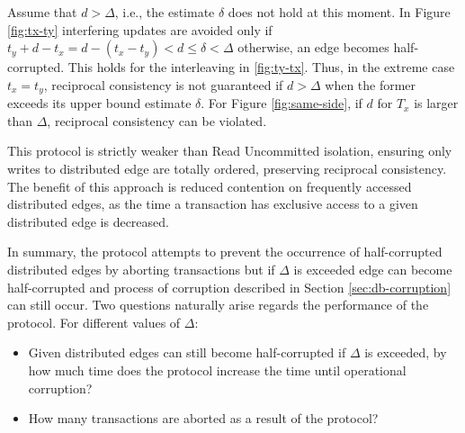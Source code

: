 Assume that $d > \Delta$, i.e., the estimate $\delta$ does not hold at this moment. In Figure \ref{fig:tx-ty} interfering updates are avoided only if $t_y + d - t_x = d - (t_x-t_y) < d \leq \delta < \Delta$ otherwise, an edge becomes half-corrupted. This holds for the interleaving in \ref{fig:ty-tx}. Thus, in the extreme case $t_x = t_y$, reciprocal consistency is not guaranteed if $d > \Delta$ when the former exceeds its upper bound estimate $\delta$. For Figure \ref{fig:same-side}, if $d$ for $T_x$ is larger than $\Delta$, reciprocal consistency can be violated.

This protocol is strictly weaker than Read Uncommitted isolation, ensuring only writes to distributed edge are totally ordered, preserving reciprocal consistency. The benefit of this approach is reduced contention on frequently accessed distributed edges, as the time a transaction has exclusive access to a given distributed edge is decreased.

In summary, the \tDelta protocol attempts to prevent the occurrence of half-corrupted distributed edges by aborting transactions but if $\Delta$ is exceeded edge can become half-corrupted and process of corruption described in Section \ref{sec:db-corruption} can still occur. Two questions naturally arise regards the performance of the protocol. For different values of $\Delta$:
\begin{itemize}
\item Given distributed edges can still become half-corrupted if $\Delta$ is exceeded, by how much time does the protocol increase the time until operational corruption?
\item How many transactions are aborted as a result of the protocol?
\end{itemize}








